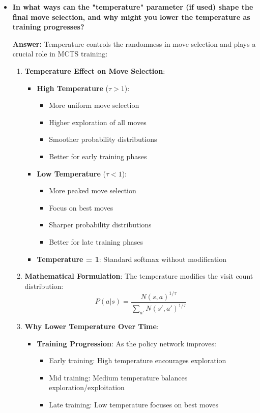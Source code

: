 \begin{itemize}
    \item \textbf{In what ways can the "temperature" parameter (if used) shape the final move selection, and why might you lower the temperature as training progresses?}
    
    \textbf{Answer:} Temperature controls the randomness in move selection and plays a crucial role in MCTS training:
    
    \begin{enumerate}
        \item \textbf{Temperature Effect on Move Selection}:
        \begin{itemize}
            \item \textbf{High Temperature} ($\tau > 1$):
            \begin{itemize}
                \item More uniform move selection
                \item Higher exploration of all moves
                \item Smoother probability distributions
                \item Better for early training phases
            \end{itemize}
            
            \item \textbf{Low Temperature} ($\tau < 1$):
            \begin{itemize}
                \item More peaked move selection
                \item Focus on best moves
                \item Sharper probability distributions
                \item Better for late training phases
            \end{itemize}
            
            \item \textbf{Temperature = 1}: Standard softmax without modification
        \end{itemize}
        
        \item \textbf{Mathematical Formulation}:
        The temperature modifies the visit count distribution:
        \[P(a|s) = \frac{N(s,a)^{1/\tau}}{\sum_{a'} N(s',a')^{1/\tau}}\]
        
        \item \textbf{Why Lower Temperature Over Time}:
        \begin{itemize}
            \item \textbf{Training Progression}: As the policy network improves:
            \begin{itemize}
                \item Early training: High temperature encourages exploration
                \item Mid training: Medium temperature balances exploration/exploitation
                \item Late training: Low temperature focuses on best moves
            \end{itemize}
            

\end{itemize}
\end{enumerate}
\end{itemize}
